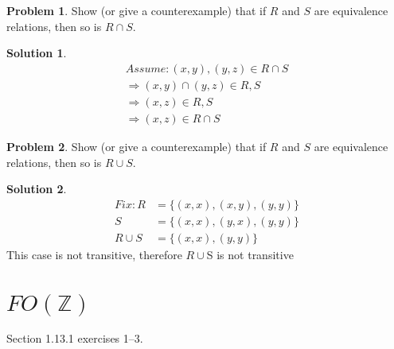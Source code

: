\documentclass[10pt]{article}
\theoremstyle{definition}
\newtheorem{prob}{Problem}
\newtheorem{sol}{Solution}
\begin{document}
  \begin{prob}
    Show (or give a counterexample) that if $R$ and $S$ are equivalence relations, then so is $R \cap
    S$.
  \end{prob}
  
  \begin{sol}
   \begin{align}
   Assume: {(x,y),(y,z)} \in R \cap S \\
     \Rightarrow (x,y) \cap (y,z) \in R,S \\
     \Rightarrow (x,z) \in R,S \\
     \Rightarrow (x,z) \in R \cap S
   \end{align}
  \end{sol}
  
  \begin{prob}
    Show (or give a counterexample) that if $R$ and $S$ are equivalence relations, then so is
    $R \cup S$.
  \end{prob}
  
  \begin{sol}
  \begin{align}
    Fix: R &= \big\{(x,x),(x,y),(y,y)\big\} \\
    S &= \big\{(x,x),(y,x),(y,y)\big\} \\
      R \cup S  &= \big\{(x,x),(y,y)\big\}
  \end{align}
  This case is not transitive, therefore $R \cup $S is not transitive
  \end{sol}
  
  
  \section*{$FO(\mathbb Z)$}
  
  Section 1.13.1 exercises 1--3.
  
\end{document}
